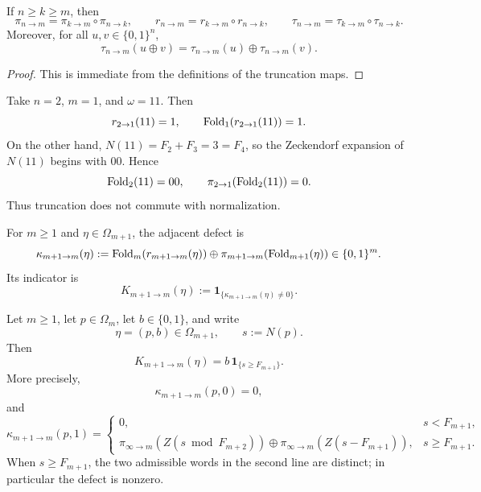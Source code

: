 \begin{lemma}
\label{lem:prefix-functoriality}
If $n\ge k\ge m$, then
\[
\pi_{n\to m}=\pi_{k\to m}\circ \pi_{n\to k},
\qquad
r_{n\to m}=r_{k\to m}\circ r_{n\to k},
\qquad
\tau_{n\to m}=\tau_{k\to m}\circ \tau_{n\to k}.
\]
Moreover, for all $u,v\in\{0,1\}^n$,
\[
\tau_{n\to m}(u\oplus v)=\tau_{n\to m}(u)\oplus\tau_{n\to m}(v).
\]
\end{lemma}

\begin{proof}
This is immediate from the definitions of the truncation maps.
\end{proof}

\begin{example}
\label{ex:noncommuting-square}
Take $n=2$, $m=1$, and $\omega=11$.  Then
\[
r_{2\to 1}(11)=1,
\qquad
\operatorname{Fold}_1(r_{2\to 1}(11))=1.
\]
On the other hand, $N(11)=F_2+F_3=3=F_4$, so the Zeckendorf expansion of
$N(11)$ begins with $00$.  Hence
\[
\operatorname{Fold}_2(11)=00,
\qquad
\pi_{2\to 1}(\operatorname{Fold}_2(11))=0.
\]
Thus truncation does not commute with normalization.
\end{example}

\begin{definition}
\label{def:adjacent-defect}
For $m\ge 1$ and $\eta\in\Omega_{m+1}$, the adjacent defect is
\[
\kappa_{m+1\to m}(\eta)
:=
\operatorname{Fold}_m(r_{m+1\to m}(\eta))
\oplus
\pi_{m+1\to m}(\operatorname{Fold}_{m+1}(\eta))
\in\{0,1\}^m.
\]
Its indicator is
\[
K_{m+1\to m}(\eta):=\mathbf{1}_{\{\kappa_{m+1\to m}(\eta)\ne 0\}}.
\]
\end{definition}

\begin{theorem}
\label{thm:adjacent-threshold}
Let $m\ge 1$, let $p\in\Omega_m$, let $b\in\{0,1\}$, and write
\[
\eta=(p,b)\in\Omega_{m+1},
\qquad
s:=N(p).
\]
Then
\[
K_{m+1\to m}(\eta)=b\,\mathbf{1}_{\{s\ge F_{m+1}\}}.
\]
More precisely,
\[
\kappa_{m+1\to m}(p,0)=0,
\]
and
\[
\kappa_{m+1\to m}(p,1)=
\begin{cases}
0,& s<F_{m+1},\\[4pt]
\pi_{\infty\to m}(Z(s\bmod F_{m+2}))
\oplus
\pi_{\infty\to m}(Z(s-F_{m+1})),
& s\ge F_{m+1}.
\end{cases}
\]
When $s\ge F_{m+1}$, the two admissible words in the second line are distinct;
in particular the defect is nonzero.
\end{theorem}

